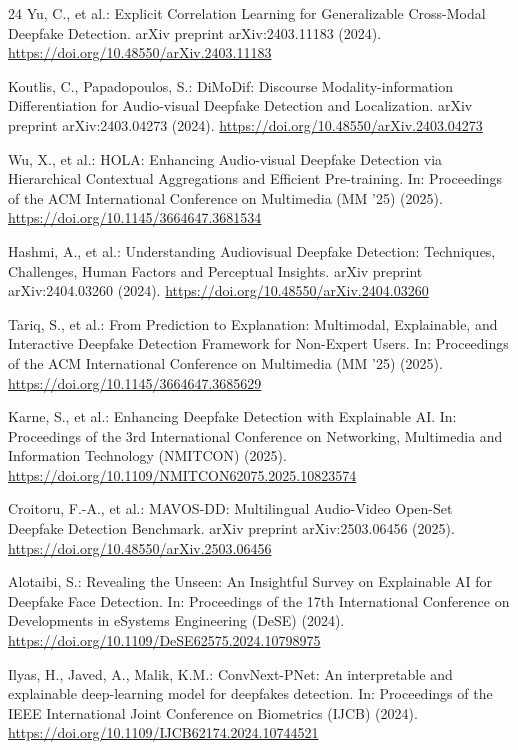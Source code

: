 \documentclass[pdflatex,sn-mathphys-num]{sn-jnl}
\begin{document}
\begin{thebibliography}{24}
Yu, C., et al.: Explicit Correlation Learning for Generalizable Cross-Modal Deepfake Detection. arXiv preprint arXiv:2403.11183 (2024). \url{https://doi.org/10.48550/arXiv.2403.11183}

Koutlis, C., Papadopoulos, S.: DiMoDif: Discourse Modality-information Differentiation for Audio-visual Deepfake Detection and Localization. arXiv preprint arXiv:2403.04273 (2024). \url{https://doi.org/10.48550/arXiv.2403.04273}

Wu, X., et al.: HOLA: Enhancing Audio-visual Deepfake Detection via Hierarchical Contextual Aggregations and Efficient Pre-training. In: Proceedings of the ACM International Conference on Multimedia (MM '25) (2025). \url{https://doi.org/10.1145/3664647.3681534}

Hashmi, A., et al.: Understanding Audiovisual Deepfake Detection: Techniques, Challenges, Human Factors and Perceptual Insights. arXiv preprint arXiv:2404.03260 (2024). \url{https://doi.org/10.48550/arXiv.2404.03260}

Tariq, S., et al.: From Prediction to Explanation: Multimodal, Explainable, and Interactive Deepfake Detection Framework for Non-Expert Users. In: Proceedings of the ACM International Conference on Multimedia (MM '25) (2025). \url{https://doi.org/10.1145/3664647.3685629}

Karne, S., et al.: Enhancing Deepfake Detection with Explainable AI. In: Proceedings of the 3rd International Conference on Networking, Multimedia and Information Technology (NMITCON) (2025). \url{https://doi.org/10.1109/NMITCON62075.2025.10823574}

Croitoru, F.-A., et al.: MAVOS-DD: Multilingual Audio-Video Open-Set Deepfake Detection Benchmark. arXiv preprint arXiv:2503.06456 (2025). \url{https://doi.org/10.48550/arXiv.2503.06456}

Alotaibi, S.: Revealing the Unseen: An Insightful Survey on Explainable AI for Deepfake Face Detection. In: Proceedings of the 17th International Conference on Developments in eSystems Engineering (DeSE) (2024). \url{https://doi.org/10.1109/DeSE62575.2024.10798975}

Ilyas, H., Javed, A., Malik, K.M.: ConvNext-PNet: An interpretable and explainable deep-learning model for deepfakes detection. In: Proceedings of the IEEE International Joint Conference on Biometrics (IJCB) (2024). \url{https://doi.org/10.1109/IJCB62174.2024.10744521}


\end{thebibliography}
\end{document}
